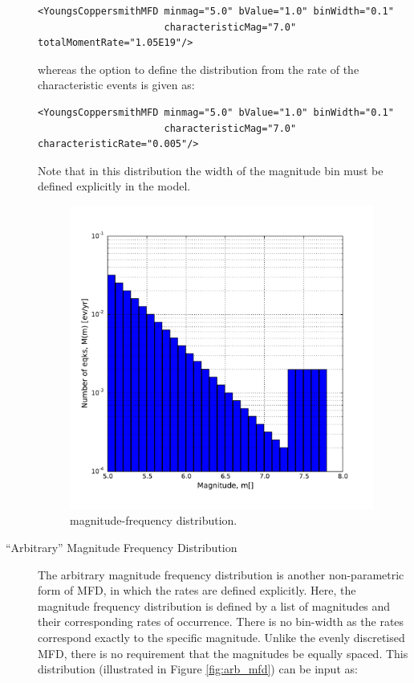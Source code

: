 \begin{description}
\begin{verbatim}
<YoungsCoppersmithMFD minmag="5.0" bValue="1.0" binWidth="0.1"
                      characteristicMag="7.0" totalMomentRate="1.05E19"/>
\end{verbatim}


\noindent whereas the option to define the distribution from the rate of the characteristic events is given as:

\begin{verbatim}
<YoungsCoppersmithMFD minmag="5.0" bValue="1.0" binWidth="0.1"
                      characteristicMag="7.0" characteristicRate="0.005"/>
\end{verbatim}

Note that in this distribution the width of the magnitude bin must be defined explicitly in the model.

\begin{figure}[!ht]
\centering
\includegraphics[width=10cm]{figures/hazard/yc_mfd_char_rate.pdf}
\caption{\cite{youngs1985} magnitude-frequency distribution.}
\label{fig:yc_gr_mfd}
\end{figure}

\item[``Arbitrary'' Magnitude Frequency Distribution]
The arbitrary magnitude frequency distribution is another non-parametric form of MFD, in which the rates are defined explicitly. Here, the magnitude frequency distribution is defined by a list of magnitudes and their corresponding rates of occurrence. There is no bin-width as the rates correspond exactly to the specific magnitude. Unlike the evenly discretised MFD, there is no requirement that the magnitudes be equally spaced. This distribution (illustrated in Figure \ref{fig:arb_mfd}) can be input as:


\end{description}
